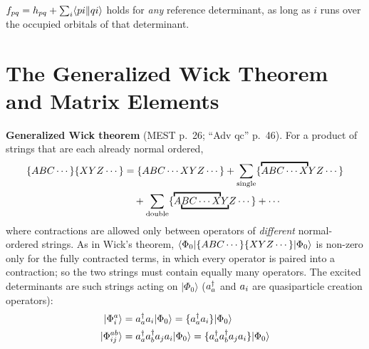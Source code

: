 \begin{remark}
$f_{pq} = h_{pq} + \sum_i \langle pi\Vert qi\rangle$ holds for \emph{any} reference determinant, as long as $i$ runs over the occupied orbitals of that determinant.
\end{remark}

\section{The Generalized Wick Theorem and Matrix Elements}

\textbf{Generalized Wick theorem} (MEST p.~26; “Adv qc” p.~46). For a product of strings that are each already normal ordered,
\begin{align*}
\no{A B C \cdots} \no{X Y Z \cdots} &= \no{A B C \cdots X Y Z \cdots} + \sum_{\text{single}} \no{{\contraction{A B C \cdots X}} Y Z \cdots} \\
&\quad + \sum_{\text{double}} \no{\mathrlap{\contraction{\phantom{A B C \cdots X}}} A {\underbracket{B C \cdots X Y}} Z \cdots} + \cdots
\end{align*}
where contractions are allowed only between operators of \emph{different} normal-ordered strings. As in Wick's theorem, $\langle \Phi_0|\{A B C \cdots\} \{X Y Z \cdots\}|\Phi_0\rangle$ is non-zero only for the fully contracted terms, in which every operator is paired into a contraction; so the two strings must contain equally many operators. The excited determinants are such strings acting on $|\Phi_0\rangle$ ($a^{\dagger}_{a}$ and $a_{i}$ are quasiparticle creation operators):
\begin{align*}
|\Phi_i^a\rangle &= a^{\dagger}_{a} a_{i} |\Phi_0\rangle = \{a^{\dagger}_{a} a_{i}\} |\Phi_0\rangle \\
|\Phi_{ij}^{ab}\rangle &= a^{\dagger}_{a} a^{\dagger}_{b} a_{j} a_{i} |\Phi_0\rangle = \{a^{\dagger}_{a} a^{\dagger}_{b} a_{j} a_{i}\} |\Phi_0\rangle
\end{align*}

